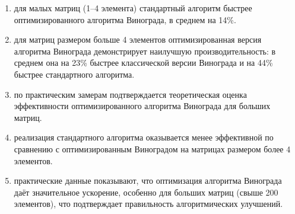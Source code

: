\begin{enumerate}
	\item для малых матриц (1–4 элемента) стандартный алгоритм быстрее оптимизированного алгоритма Винограда, в среднем на 14\%.
	\item для матриц размером больше 4 элементов оптимизированная версия алгоритма Винограда демонстрирует наилучшую производительность: в среднем она на 23\% быстрее классической версии Винограда и на 44\% быстрее стандартного алгоритма.
	\item по практическим замерам подтверждается теоретическая оценка эффективности оптимизированного алгоритма Винограда для больших матриц.
	\item реализация стандартного алгоритма оказывается менее эффективной по сравнению с оптимизированным Виноградом на матрицах размером более 4 элементов.
	\item практические данные показывают, что оптимизация алгоритма Винограда даёт значительное ускорение, особенно для больших матриц (свыше 200 элементов), что подтверждает правильность алгоритмических улучшений.
\end{enumerate}

